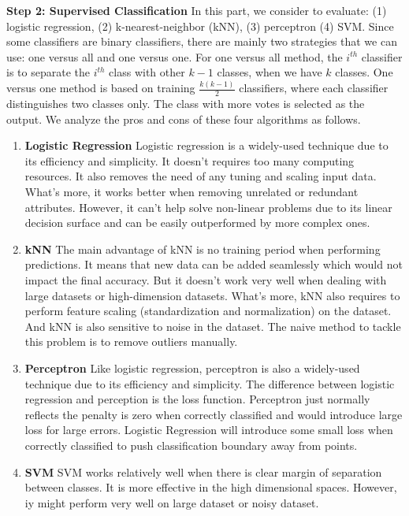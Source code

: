 \documentclass[12pt]{article}
\begin{document}
\textbf{Step 2: Supervised Classification} 
In this part, we consider to evaluate: (1) logistic regression, (2) k-nearest-neighbor (kNN), (3) perceptron (4) SVM. Since some classifiers are binary classifiers, there are mainly two strategies that we can use: one versus all and one versus one. For one versus all method, the $i^{th}$ classifier is to separate the $i^{th}$ class with other $k-1$ classes, when we have $k$ classes. One versus one method is based on training $\frac{k(k-1)}{2}$ classifiers, where each classifier distinguishes two classes only. The class with more votes is selected as the output. We analyze the pros and cons of these four algorithms as follows.

\begin{enumerate}[label=(\roman*)]
	\item \textbf{Logistic Regression} 
	Logistic regression is a widely-used technique due to its efficiency and simplicity. It doesn't requires too many computing resources. It also removes the need of any tuning and scaling input data. What's more, it works better when removing unrelated or redundant attributes. However, it can't help solve non-linear problems due to its linear decision surface and can be easily outperformed by more complex ones.
	\item \textbf{kNN} 
	The main advantage of kNN is no training period when performing predictions. It means that new data can be added seamlessly which would not impact the final accuracy. But it doesn't work very well when dealing with large datasets or high-dimension datasets. What's more, kNN also requires to perform feature scaling (standardization and normalization) on the dataset. And kNN is also sensitive to noise in the dataset. The naive method to tackle this problem is to remove outliers manually.
    \item \textbf{Perceptron} 
	Like logistic regression, perceptron is also a widely-used technique due to its efficiency and simplicity. The difference between logistic regression and perception is the loss function. Perceptron just normally reflects the penalty is zero when correctly classified and would introduce large loss for large errors. Logistic Regression will introduce some small loss when correctly classified to push classification boundary away from points.
	\item \textbf{SVM} 
	SVM works relatively well when there is clear margin of separation between classes. It is more effective in the high dimensional spaces. However, iy might perform very well on large dataset or noisy dataset.
\end{enumerate}
\end{document}
